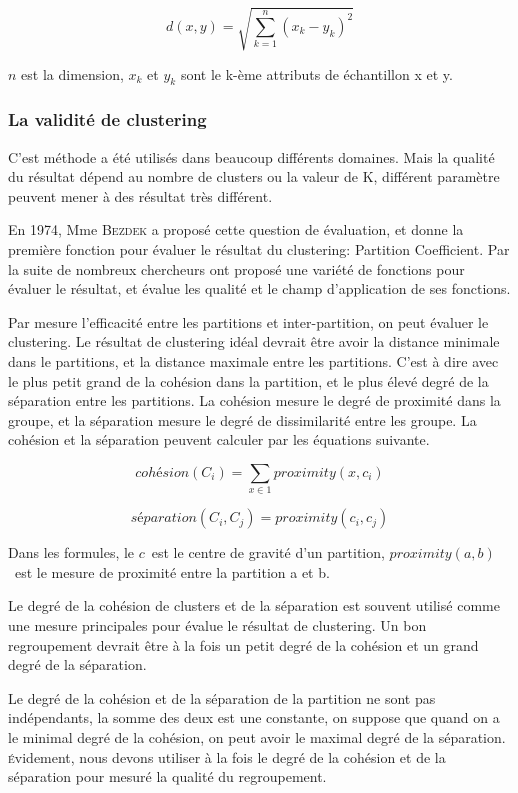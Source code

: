 $$d(x,y) = \sqrt {\sum_{k=1}^n  (x_{k}-y_{k})^2}$$

$n$ est la dimension, $x_{k}$ et $ y_{k}$ sont le k-ème attributs de échantillon x et y.


\subsubsection{La validité de clustering}
C'est méthode a été utilisés dans beaucoup différents domaines. Mais la qualité du résultat dépend au nombre de clusters ou la valeur de K, différent paramètre peuvent mener à des résultat très différent.

En 1974, Mme \textsc{Bezdek} a proposé cette question de évaluation, et donne la première fonction pour évaluer le résultat du clustering: \textsf{Partition}  \textsf{Coefficient}. Par la suite de nombreux chercheurs ont proposé une variété de fonctions pour évaluer le résultat, et évalue les qualité et le champ d'application de ses fonctions. 

Par mesure l'efficacité entre les partitions et inter-partition, on peut évaluer le clustering. Le résultat de clustering idéal devrait être avoir la distance minimale dans le partitions, et la distance maximale entre les partitions. C'est à dire avec le plus petit grand de la cohésion dans la partition, et le plus élevé degré de la séparation entre les partitions. La cohésion mesure le degré de proximité dans la groupe, et la séparation mesure le degré de dissimilarité entre les groupe. La cohésion et la séparation peuvent calculer par les équations suivante.

$$cohésion(C_{i}) = \sum_{x\in1} proximity(x, c_{i})$$

$$séparation(C_{i},C_{j}) = proximity(c_{i}, c_{j})$$


Dans les formules, le \(c\)\ est le centre de gravité d'un partition, \(proximity(a,b)\)\ est le mesure de proximité entre la partition a et b.

Le degré de la cohésion de clusters et de la séparation est souvent utilisé comme une mesure principales pour évalue le résultat de clustering. Un bon regroupement devrait être à la fois un petit degré de la cohésion et un grand degré de la séparation.

Le degré de la cohésion et de la séparation de la partition ne sont pas indépendants, la somme des deux est une constante, on suppose que quand on a le minimal degré de la cohésion, on peut avoir le maximal degré de la séparation. \textsc{é}videment, nous devons utiliser à la fois le degré de la cohésion et de la séparation pour mesuré la qualité du regroupement.


